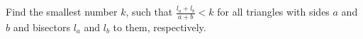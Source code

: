 Find the smallest number $k$, such that  $ \frac{l_a+l_b}{a+b}<k$ for all triangles with sides $a$ and $b$ and bisectors $l_a$ and $l_b$ to them, respectively.

